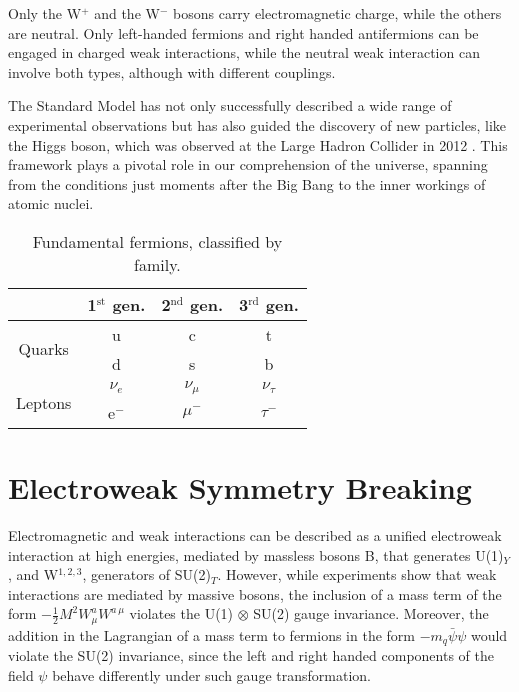 Only the W$^+$ and the W$^-$ bosons carry electromagnetic charge, while the others are neutral.
Only left-handed fermions and right handed antifermions can be engaged in charged weak interactions, while the neutral weak interaction can involve both types, although with different couplings.

The Standard Model has not only successfully described a wide range of experimental observations but has also guided the discovery of new particles, like the Higgs boson, which was observed at the Large Hadron Collider in 2012 .
This framework plays a pivotal role in our comprehension of the universe, spanning from the conditions just moments after the Big Bang to the inner workings of atomic nuclei.

\begin{table}[tbh]
	\centering
	\caption{Fundamental fermions, classified by family.}
	\label{tab:fermions}
	\begin{tabular}{ c c c c }
		\hline
		 & 1$^{\text{st}}$ gen. & 2$^{\text{nd}}$ gen. & 3$^{\text{rd}}$ gen. \\%
		\hline
		\multirow{2}{*}{Quarks}  & u       & c         & t          \\%
		                         & d       & s         & b          \\%
		\hline
		\multirow{2}{*}{Leptons} & $\nu_e$ & $\nu_\mu$ & $\nu_\tau$ \\%
		                         & e$^-$   & $\mu$$^-$ & $\tau$$^-$ \\%
		\hline
	\end{tabular}
\end{table}

\section{Electroweak Symmetry Breaking}
\label{EWSB}
Electromagnetic and weak interactions can be described as a unified electroweak interaction at high energies, mediated by massless bosons B, that generates U(1)$_Y$, and W$^{1, 2, 3}$, generators of SU(2)$_T$.
However, while experiments show that weak interactions are mediated by massive bosons, the inclusion of a mass term of the form $-\frac{1}{2} M^2 W^a_\mu W^{a\, \mu}$ violates the U(1) $\otimes$ SU(2) gauge invariance.
Moreover, the addition in the Lagrangian of a mass term to fermions in the form $-m_q \bar\psi \psi$ would violate the SU(2) invariance, since the left and right handed components of the field $\psi$ behave differently under such gauge transformation.

